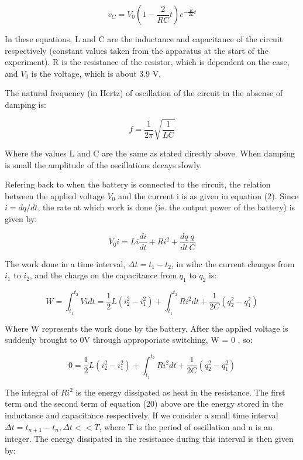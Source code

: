 \documentclass[twocolumn, letterpaper, 10pt, twoside]{article}
\begin{document}
   \begin{equation}
v_C = V_0(1 - \frac{2}{RC}t)e^{-\frac{R}{2L}t}
\end{equation}

In these equations, L and C are the inductance and capacitance of the circuit respectively (constant values taken from the apparatus at the start of the experiment). R is the resistance of the resistor, which is dependent on the case, and $V_0$ is the voltage, which is about 3.9 V. 

The natural frequency (in Hertz) of oscillation of the circuit in the absense of damping is: 

 \begin{equation}
f = \frac{1}{2\pi}\sqrt{\frac{1}{LC}}
\end{equation}

Where the values L and C are the same as stated directly above. When damping is small the amplitude of the oscillations decays slowly. 

Refering back to when the battery is connected to the circuit, the relation between the applied voltage $V_0$ and the current i is as given in equation (2). Since $i = dq / dt$, the rate at which work is done (ie. the output power of the battery) is given by: 

 \begin{equation}
V_0i = Li\frac{di}{dt} + Ri^2 + \frac{dq}{dt}\frac{q}{C}
\end{equation}

The work done in a time interval, $\Delta t = t_1 - t_2$, in wihc the current changes from $i_1$ to $i_2$, and the charge on the capacitance from $q_1$ to $q_2$ is: 

 \begin{equation}
W = \int_{t_1}^{t_2}Vidt = \frac{1}{2}L(i_2^2 - i_1^2) + \int_{t_1}^{t_2}Ri^2dt + \frac{1}{2C}(q_2^2 - q_1^2)
\end{equation}

Where W represents the work done by the battery. After the applied voltage is suddenly brought to 0V through approporiate switching, W = 0 , so: 

 \begin{equation}
0 =  \frac{1}{2}L(i_2^2 - i_1^2) + \int_{t_1}^{t_2}Ri^2dt + \frac{1}{2C}(q_2^2 - q_1^2)
\end{equation}

The integral of $Ri^2$ is the energy dissipated as heat in the resistance. The first term and the second term of equation (20) above are the energy stored in the inductance and capacitance respectively. If we consider a small time interval $\Delta t = t_{n+1} - t_n, \Delta t << T$, where T is the period of oscillation and n is an integer. The energy dissipated in the resistance during this interval is then given by: 
\end{document}
